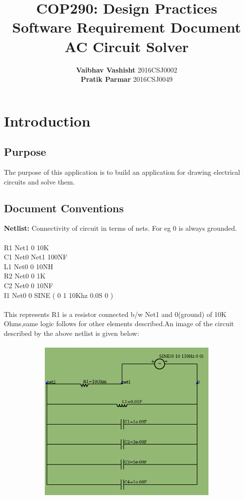 \documentclass[12pt]{extarticle}
\date{}
\author{\textbf{Vaibhav Vashisht} 2016CSJ0002  \\\textbf{Pratik Parmar} 2016CSJ0049}
\title{\textbf{COP290: Design Practices\\ Software Requirement Document \\ AC Circuit Solver  }}
\begin{document}
\maketitle
\newpage


\section{Introduction}

\subsection{Purpose}
The purpose of this application is to build an application for drawing electrical circuits and solve them.
\subsection{Document Conventions}
\textbf{Netlist:} Connectivity of circuit in terms of nets. For eg
0 is always grounded.\\
\\R1 Net1 0 10K\\
C1 Net0 Net1 100NF\\
L1 Net0 0 10NH\\
R2 Net0 0 1K\\
C2 Net0 0 10NF\\
I1 Net0 0 SINE ( 0 1 10Khz 0.0S 0 )\\ \\This represents R1 is a resistor connected b/w Net1 and 0(ground) of 
10K Ohms,same logic follows for other elements described.An image of the circuit described by the above netlist is given below:\\
\\
\includegraphics[width=14cm, height=8cm]{Top}
\end{document}
